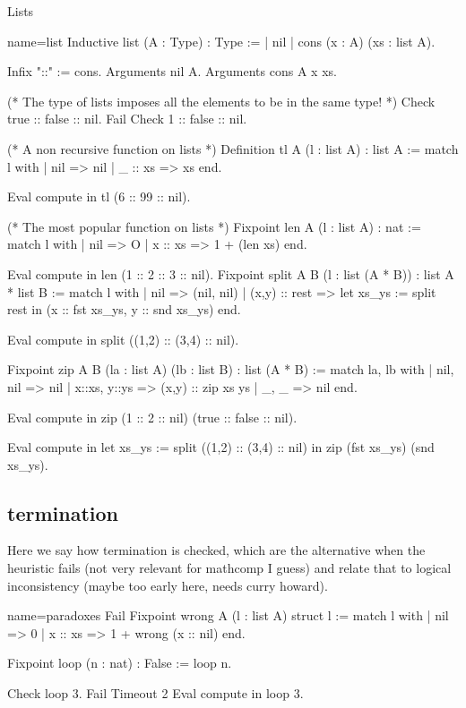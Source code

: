Lists

\begin{coq}{name=list}{}
Inductive list (A : Type) : Type :=
| nil
| cons (x : A) (xs : list A).

Infix "::" := cons.
Arguments nil {A}.
Arguments cons {A} x xs.

(* The type of lists imposes all the elements to
    be in the same type! *)
Check true :: false :: nil.
Fail Check 1 :: false :: nil.

(* A non recursive function on lists *)
Definition tl A (l : list A) : list A :=
  match l with
  | nil => nil
  | _ :: xs => xs
  end.

Eval compute in tl (6 :: 99 :: nil).

(* The most popular function on lists *)
Fixpoint len A (l : list A) : nat :=
  match l with
  | nil => O
  | x :: xs => 1 + (len xs)
  end.

Eval compute in len (1 :: 2 :: 3 :: nil).
Fixpoint split A B (l : list (A * B)) : list A * list B :=
  match l with
  | nil => (nil, nil)
  | (x,y) :: rest =>
      let xs_ys := split rest in
      (x :: fst xs_ys, y :: snd xs_ys)
  end.

Eval compute in
  split ((1,2) :: (3,4) :: nil).

Fixpoint zip A B (la : list A) (lb : list B) : list (A * B) :=
  match la, lb with
  | nil, nil => nil
  | x::xs, y::ys => (x,y) :: zip xs ys
  | _, _ => nil
  end.

Eval compute in
  zip (1 :: 2 :: nil) (true :: false :: nil).

Eval compute in
  let xs_ys := split ((1,2) :: (3,4) :: nil) in
  zip (fst xs_ys) (snd xs_ys).
\end{coq}

\subsection{termination}

Here we say how termination is checked, which are the alternative when the
heuristic fails (not very relevant for mathcomp I guess) and relate that to
logical inconsistency (maybe too early here, needs curry howard).

\begin{coq}{name=paradoxes}{}
Fail
Fixpoint wrong A (l : list A) {struct l} :=
  match l with
  | nil => 0
  | x :: xs => 1 + wrong (x :: nil)
  end.

Fixpoint loop (n : nat) : False := loop n.

Check loop 3.
Fail Timeout 2 Eval compute in loop 3.
\end{coq}

